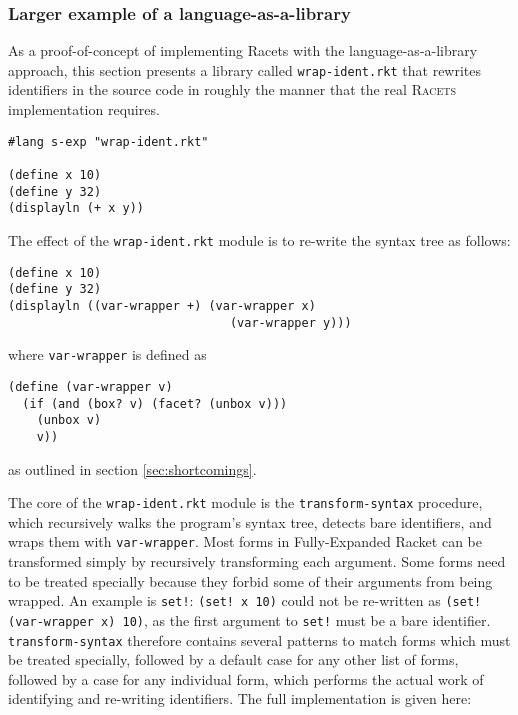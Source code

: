 \documentclass{article}
\begin{document}
\subsubsection{Larger example of a language-as-a-library}
As a proof-of-concept of implementing Racets with the language-as-a-library approach, this section presents a library called \texttt{wrap-ident.rkt} that rewrites identifiers in the source code in roughly the manner that the real \textsc{Racets} implementation requires.

\begin{lstlisting}
#lang s-exp "wrap-ident.rkt"

(define x 10)
(define y 32)
(displayln (+ x y))
\end{lstlisting}

The effect of the \texttt{wrap-ident.rkt} module is to re-write the syntax tree as follows:

\begin{lstlisting}
(define x 10)
(define y 32)
(displayln ((var-wrapper +) (var-wrapper x)
                               (var-wrapper y)))
\end{lstlisting}

\noindent where \texttt{var-wrapper} is defined as

\begin{lstlisting}
(define (var-wrapper v)
  (if (and (box? v) (facet? (unbox v)))
    (unbox v)
    v))
\end{lstlisting}

\noindent as outlined in section \ref{sec:shortcomings}.

The core of the \texttt{wrap-ident.rkt} module is the \texttt{transform-syntax} procedure, which recursively walks the program's syntax tree, detects bare identifiers, and wraps them with \texttt{var-wrapper}. Most forms in Fully-Expanded Racket can be transformed simply by recursively transforming each argument. Some forms need to be treated specially because they forbid some of their arguments from being wrapped. An example is \texttt{set!}: \texttt{(set! x 10)} could not be re-written as \texttt{(set! (var-wrapper x) 10)}, as the first argument to \texttt{set!} must be a bare identifier. \texttt{transform-syntax} therefore contains several patterns to match forms which must be treated specially, followed by a default case for any other list of forms, followed by a case for any individual form, which performs the actual work of identifying and re-writing identifiers. The full implementation is given here:
\end{document}
